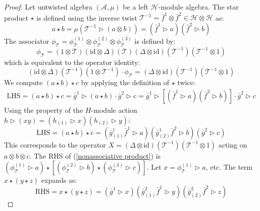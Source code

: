 \documentclass[reqno]{amsart}
\theoremstyle{definition}
\theoremstyle{remark}
\begin{document}
\begin{proof}
    Let untwisted algebra $(\mathscr{A}, \mu)$ be a left $\mathscr{H}$-module algebra. The star product $\star$ is defined using the inverse twist $\mathcal{T}^{-1} = \bar{f}^1 \otimes \bar{f}^2 \in \mathscr{H} \otimes \mathscr{H}$ as:
\begin{equation}
a \star b = \mu \left( \mathcal{T}^{-1} \triangleright (a \otimes b) \right) = (\bar{f}^1 \triangleright a)(\bar{f}^2 \triangleright b)
\end{equation}
The associator $\phi_\mathcal{T} = \phi_{\mathcal{T}}^{(1)} \otimes \phi_{\mathcal{T}}^{(2)} \otimes \phi_{\mathcal{T}}^{(3)}$ is defined by:
\begin{equation}
\phi_\mathcal{T} = (1 \otimes \mathcal{T}) (\text{id} \otimes \Delta)(\mathcal{T}) (\Delta \otimes \text{id})(\mathcal{T}^{-1}) (\mathcal{T}^{-1} \otimes 1)
\end{equation}
which is equivalent to the operator identity:
\begin{equation}
(\text{id} \otimes \Delta)(\mathcal{T}^{-1}) (1 \otimes \mathcal{T}^{-1}) \cdot \phi_\mathcal{T} = (\Delta \otimes \text{id})(\mathcal{T}^{-1}) (\mathcal{T}^{-1} \otimes 1)
\end{equation}
We compute $(a \star b) \star c$ by applying the definition of $\star$ twice:
\begin{align*}
\text{LHS}=(a \star b) \star c = \bar{g}^1 \triangleright (a \star b) \cdot \bar{g}^2 \triangleright c = \bar{g}^1 \triangleright [(\bar{f}^1 \triangleright a)(\bar{f}^2 \triangleright b)] \cdot \bar{g}^2 \triangleright c
\end{align*}
Using the property of the $H$-module action $h \triangleright (xy) = (h_{(1)} \triangleright x)(h_{(2)} \triangleright y)$:
\begin{equation}
\text{LHS}=(a \star b) \star c = (\bar{g}^1_{(1)} \bar{f}^1 \triangleright a) (\bar{g}^1_{(2)} \bar{f}^2 \triangleright b) (\bar{g}^2 \triangleright c)
\end{equation}
This corresponds to the operator $X = (\Delta \otimes \text{id})(\mathcal{T}^{-1}) (\mathcal{T}^{-1} \otimes 1)$ acting on $a \otimes b \otimes c$. The RHS of (\ref{nonassociative product}) is $(\phi_{\mathcal{T}}^{(1)} \triangleright a) \star [(\phi_{\mathcal{T}}^{(2)} \triangleright b) \star (\phi_{\mathcal{T}}^{(3)} \triangleright c)]$. Let $x = \phi_{\mathcal{T}}^{(1)} \triangleright a$, etc. The term $x \star (y \star z)$ expands as:
\begin{equation}
\text{RHS}=x \star (y \star z) = (\bar{g}^1 \triangleright x) (\bar{g}^2_{(1)} \bar{f}^1 \triangleright y) (\bar{g}^2_{(2)} \bar{f}^2 \triangleright z)

\end{equation}
\end{proof}
\end{document}
